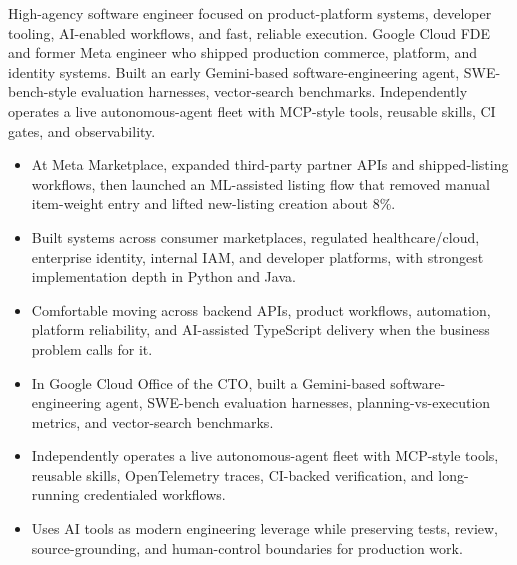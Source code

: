 


High-agency software engineer focused on product-platform systems, developer tooling, AI-enabled workflows, and fast, reliable execution. Google Cloud FDE and former Meta engineer who shipped production commerce, platform, and identity systems. Built an early Gemini-based software-engineering agent, SWE-bench-style evaluation harnesses, vector-search benchmarks. Independently operates a live autonomous-agent fleet with MCP-style tools, reusable skills, CI gates, and observability.
\begin{itemize}
  \item At Meta Marketplace, expanded third-party partner APIs and shipped-listing workflows, then launched an ML-assisted listing flow that removed manual item-weight entry and lifted new-listing creation about 8\%.
  \item Built systems across consumer marketplaces, regulated healthcare/cloud, enterprise identity, internal IAM, and developer platforms, with strongest implementation depth in Python and Java.
  \item Comfortable moving across backend APIs, product workflows, automation, platform reliability, and AI-assisted TypeScript delivery when the business problem calls for it.
\end{itemize}
\begin{itemize}
  \item In Google Cloud Office of the CTO, built a Gemini-based software-engineering agent, SWE-bench evaluation harnesses, planning-vs-execution metrics, and vector-search benchmarks.
  \item Independently operates a live autonomous-agent fleet with MCP-style tools, reusable skills, OpenTelemetry traces, CI-backed verification, and long-running credentialed workflows.
  \item Uses AI tools as modern engineering leverage while preserving tests, review, source-grounding, and human-control boundaries for production work.
\end{itemize}




